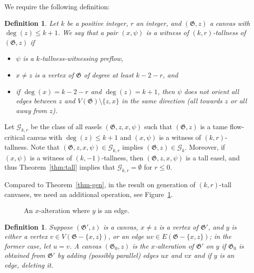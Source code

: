 \documentclass{article}
\newcommand{\GG}{\mathcal{G}}
\newcommand\g{\mathfrak{G}}
\newtheorem{definition}[theorem]{Definition}
\begin{document}
We require the following definition:

\begin{definition}
\label{def:krtall}
Let $k$ be a positive integer, $r$ an integer, and $(\g,z)$ a canvas with $\deg(z) \le k+1$.  We say that a pair $(x,\psi)$ is a \emph{witness of $(k,r)$-tallness} of $(\g,z)$ if
\begin{itemize}
\item $\psi$ is a $k$-tallness-witnessing preflow,
\item $x\neq z$ is a vertex of $\g$ of degree at least $k-2-r$, and
\item if $\deg(x)=k-2-r$ and $\deg(z)=k+1$, then $\psi$ does not orient all edges between $z$ and $V(\g)\setminus\{z,x\}$ in the same direction
(all towards $z$ or all away from $z$).
\end{itemize}
\end{definition}
Let $\GG_{k,r}$ be the class of all easels $(\g,z,x,\psi)$ such that $(\g,z)$ is a tame flow-critical canvas with $\deg(z)\le k+1$ and $(x,\psi)$ is a witness of $(k,r)$-tallness.
Note that $(\g,z,x,\psi)\in \GG_{k,r}$ implies $(\g,z)\in\GG_k$. 
Moreover, if $(x, \psi)$ is a witness of $(k,-1)$-tallness, then $(\g,z,x,\psi)$ is a tall easel, and thus Theorem~\ref{thm:tall} implies that $\GG_{k,r}=\emptyset$ for $r\le 0$.

Compared to Theorem~\ref{thm-gen}, in the result on generation of $(k,r)$-tall canvases, we need an additional operation, see Figure~\ref{fig-xalter}.

\begin{figure}
\begin{center}
\caption{An $x$-alteration where $y$ is an edge.}\label{fig-xalter}
\end{center}
\end{figure}
\begin{definition}
Suppose $(\g',z)$ is a canvas, $x\neq z$ is a vertex of $\g'$, and $y$ is either a vertex $v\in V(\g-\{x,z\})$, or an edge $uv\in E(\g-\{x,z\})$; in the former case, let $u=v$.
A canvas $(\g_0,z)$ is the \emph{$x$-alteration} of $\g'$ on $y$ if $\g_0$ is obtained from $\g'$ by adding (possibly parallel) edges $ux$ and $vx$  and if $y$ is an edge, deleting it.
\end{definition}
\end{document}
